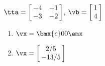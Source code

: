 {$\tta = \left[\hskip -3pt \begin{array}{cc} -4&-1\\  -3&-2\end {array} \hskip -3pt
 \right]$, $\vb=\left[\hskip -3pt \begin{array}{c} 1\\  4\end{array}\hskip -3pt \right]$}
{\begin{enumerate}
\item	 $\vx=\bmx{c}0\\0\emx$
\item	 $\vx=\left[\hskip -3pt \begin{array}{c} 2/5\\   -13/5
\end{array}\hskip -3pt \right]$
\end{enumerate}
 }







